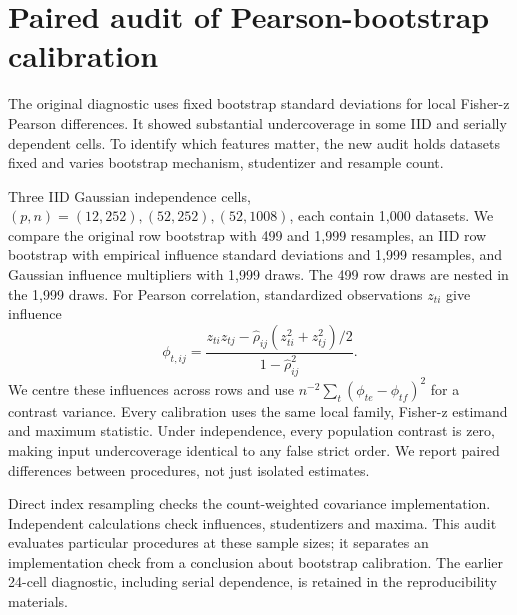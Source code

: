 \section{Paired audit of Pearson-bootstrap calibration}\label{sec:audit}
The original diagnostic uses fixed bootstrap standard deviations for local Fisher-z Pearson differences. It showed substantial undercoverage in some IID and serially dependent cells. To identify which features matter, the new audit holds datasets fixed and varies bootstrap mechanism, studentizer and resample count.

Three IID Gaussian independence cells, $(p,n)=(12,252),(52,252),(52,1008)$, each contain 1,000 datasets. We compare the original row bootstrap with 499 and 1,999 resamples, an IID row bootstrap with empirical influence standard deviations and 1,999 resamples, and Gaussian influence multipliers with 1,999 draws. The 499 row draws are nested in the 1,999 draws. For Pearson correlation, standardized observations $z_{ti}$ give influence
\[
 \phi_{t,ij}=\frac{z_{ti}z_{tj}-\widehat\rho_{ij}(z_{ti}^2+z_{tj}^2)/2}{1-\widehat\rho_{ij}^2}.
\]
We centre these influences across rows and use $n^{-2}\sum_t(\phi_{te}-\phi_{tf})^2$ for a contrast variance. Every calibration uses the same local family, Fisher-z estimand and maximum statistic. Under independence, every population contrast is zero, making input undercoverage identical to any false strict order. We report paired differences between procedures, not just isolated estimates.

Direct index resampling checks the count-weighted covariance implementation. Independent calculations check influences, studentizers and maxima. This audit evaluates particular procedures at these sample sizes; it separates an implementation check from a conclusion about bootstrap calibration. The earlier 24-cell diagnostic, including serial dependence, is retained in the reproducibility materials.



